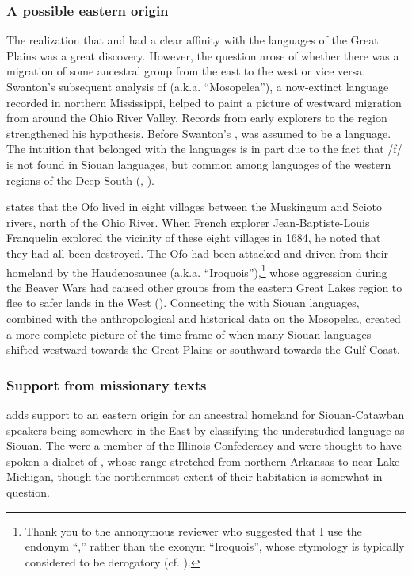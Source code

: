 \documentclass[output=paper]{LSP/langsci}
\begin{document}
\subsubsection{A possible eastern origin} The realization that  and  had a clear affinity with the  languages of the Great Plains was a great discovery. However, the question arose of whether there was a migration of some ancestral group from the east to the west or vice versa. Swanton's \citeyear{Swanton1909} subsequent analysis of  (a.k.a. ``Mosopelea''), a now-extinct language recorded in northern Mississippi, helped to paint a picture of westward migration from around the Ohio River Valley. Records from early explorers to the region strengthened his hypothesis. Before Swanton's ,  was assumed to be a  language. The intuition that  belonged with the  languages is in part due to the fact that /f/ is not found in Siouan languages, but common among languages of the western regions of the Deep South (\citealt{Rankin2004ofo}, \citealt{Kaufman2014}). 

\citet{Hanna1911} states that the Ofo lived in eight villages between the Muskingum and Scioto rivers, north of the Ohio River. When French explorer Jean-Baptiste-Louis Franquelin explored the vicinity of these eight villages in 1684, he noted that they had all been destroyed. The Ofo had been attacked and driven from their homeland by the Haudenosaunee (a.k.a. ``Iroquois''),\footnote{Thank you to the annonymous reviewer who suggested that I use the endonym ``,'' rather than the exonym ``Iroquois'', whose etymology is typically considered to be derogatory (cf. \citealt{Day1968}).} whose aggression during the Beaver Wars had caused other groups from the eastern Great Lakes region to flee to safer lands in the West (\citealt{Swanton1952}). Connecting the  with Siouan languages, combined with the anthropological and historical data on the Mosopelea, created a more complete picture of the time frame of when many Siouan languages shifted westward towards the Great Plains or southward towards the Gulf Coast. 

\subsubsection{Support from missionary texts} \citet{Koontz1995a,Koontz1995b} adds support to an eastern origin for an ancestral homeland for Siouan-Catawban speakers being somewhere in the East by classifying the understudied  language  as Siouan. The  were a member of the Illinois Confederacy and were thought to have spoken a dialect of , whose range stretched from northern Arkansas to near Lake Michigan, though the northernmost extent of their habitation is somewhat in question. 
\end{document}
